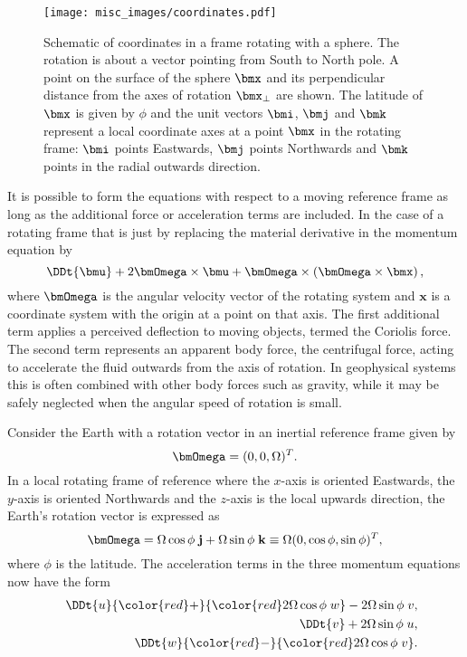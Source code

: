\begin{figure}\label{fig:rotating_frame}
\centering
\texttt{[image: misc\_images/coordinates.pdf]}
\caption{Schematic of coordinates in a frame rotating with a sphere. The rotation is about a vector
pointing from South to North pole. A point on the surface of the sphere $\bmx$ and its perpendicular
distance from the axes of rotation $\bmx_{\perp}$ are shown. The latitude of $\bmx$ is given by $\phi$ 
and the unit vectors $\bmi$, $\bmj$ and $\bmk$ represent a local coordinate axes at a point $\bmx$ in the rotating
frame: $\bmi$ points Eastwards, $\bmj$ points Northwards and $\bmk$ points in the radial outwards direction.}
\end{figure}

It is possible to form the equations with respect to a moving reference frame as long as the
additional force or acceleration terms are included. In the case of a rotating frame that is
just by replacing the material derivative in the momentum equation by
\begin{equation}
\DDt{\bmu} + 2\bmOmega\times\bmu +\bmOmega\times\left(\bmOmega\times \bmx \right),
\end{equation}
where $\bmOmega$ is the angular velocity vector of the rotating
system and $\bm{x}$ is a coordinate system with the origin at a point on that axis. The first additional term applies a perceived deflection to moving objects, termed the Coriolis force. The second term represents an apparent body force, the centrifugal force, acting to accelerate the fluid outwards from the axis of rotation. In geophysical systems this is often combined with other body forces such as gravity, while it may be safely neglected when the angular speed of rotation is small.

Consider the Earth with a rotation vector in an inertial reference frame given by 
\begin{equation}\label{eq:on_sphere_rotation}
\bmOmega=(0,0,\Omega)^T.
\end{equation}
In a local rotating frame of reference where the
$x$-axis is oriented Eastwards,
the $y$-axis is oriented Northwards and the $z$-axis is the local upwards direction,
the Earth's rotation vector is expressed as
\begin{equation*}
\bmOmega = \Omega \cos \phi\; {\bf j} + \Omega \sin \phi\; {\bf k} \equiv \Omega (0,\cos\phi,\sin\phi)^T,
\end{equation*}
where $\phi$ is the latitude.
The acceleration terms in the three momentum equations now have the form
{\setlength\arraycolsep{2pt}
\begin{eqnarray*}
&&\DDt{u} {\color{red}+} {\color{red}2\Omega\cos\phi\; w} - 2\Omega\sin\phi\; v,\\
&&\DDt{v} + 2\Omega\sin\phi\; u,\\
&&\DDt{w} {\color{red}-} {\color{red}2\Omega\cos\phi\; v}.
\end{eqnarray*}}

